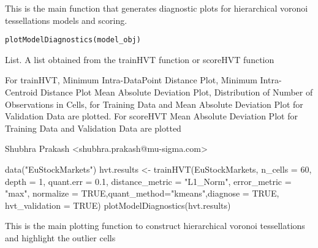 \documentclass[letterpaper]{book}
\begin{document}
%
\begin{Description}
This is the main function that generates diagnostic plots for 
hierarchical voronoi tessellations models and scoring.
\end{Description}
%
\begin{Usage}
\begin{verbatim}
plotModelDiagnostics(model_obj)
\end{verbatim}
\end{Usage}
%
\begin{Arguments}
\begin{ldescription}
\item[\code{model\_obj}] List. A list obtained from the trainHVT
function or scoreHVT function
\end{ldescription}
\end{Arguments}
%
\begin{Value}
For trainHVT, Minimum Intra-DataPoint Distance Plot, Minimum Intra-Centroid Distance Plot
Mean Absolute Deviation Plot, Distribution of Number of Observations in Cells, for Training Data and
Mean Absolute Deviation Plot for Validation Data are plotted.
For scoreHVT Mean Absolute Deviation Plot for Training Data and Validation Data are plotted
\end{Value}
%
\begin{Author}
Shubhra Prakash <shubhra.prakash@mu-sigma.com>
\end{Author}
%
\begin{SeeAlso}
\end{SeeAlso}
%
\begin{Examples}
\begin{ExampleCode}
data("EuStockMarkets")
hvt.results <- trainHVT(EuStockMarkets, n_cells = 60, depth = 1, quant.err = 0.1, 
                       distance_metric = "L1_Norm", error_metric = "max",
                       normalize = TRUE,quant_method="kmeans",diagnose = TRUE, 
                       hvt_validation = TRUE)
plotModelDiagnostics(hvt.results)
\end{ExampleCode}
\end{Examples}
%
\begin{Description}
This is the main plotting function to construct hierarchical voronoi tessellations 
and highlight the outlier cells
\end{Description}
\end{document}
